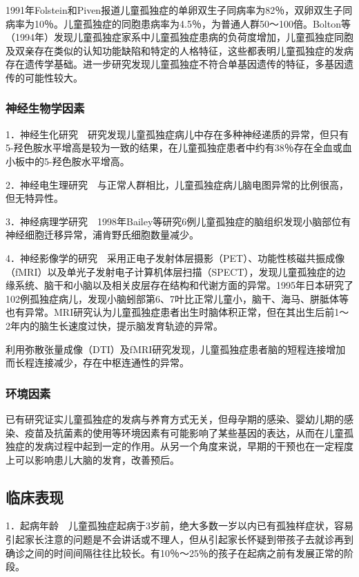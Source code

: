 1991年Folstein和Piven报道儿童孤独症的单卵双生子同病率为82％，双卵双生子同病率为10％。儿童孤独症的同胞患病率为4.5％，为普通人群50～100倍。Bolton等（1994年）发现儿童孤独症家系中儿童孤独症患病的负荷度增加，儿童孤独症同胞及双亲存在类似的认知功能缺陷和特定的人格特征，这些都表明儿童孤独症的发病存在遗传学基础。进一步研究发现儿童孤独症不符合单基因遗传的特征，多基因遗传的可能性较大。

\subsubsection{神经生物学因素}

1．神经生化研究　研究发现儿童孤独症病儿中存在多种神经递质的异常，但只有5-羟色胺水平增高是较为一致的结果，在儿童孤独症患者中约有38％存在全血或血小板中的5-羟色胺水平增高。

2．神经电生理研究　与正常人群相比，儿童孤独症病儿脑电图异常的比例很高，但无特异性。

3．神经病理学研究　1998年Bailey等研究6例儿童孤独症的脑组织发现小脑部位有神经细胞迁移异常，浦肯野氏细胞数量减少。

4．神经影像学的研究　采用正电子发射体层摄影（PET）、功能性核磁共振成像（fMRI）以及单光子发射电子计算机体层扫描（SPECT），发现儿童孤独症的边缘系统、脑干和小脑以及相关皮层存在结构和代谢方面的异常。1995年日本研究了102例孤独症病儿，发现小脑蚓部第6、7叶比正常儿童小，脑干、海马、胼胝体等也有异常。MRI研究认为儿童孤独症患者出生时脑体积正常，但在其出生后前1～2年内的脑生长速度过快，提示脑发育轨迹的异常。

利用弥散张量成像（DTI）及fMRI研究发现，儿童孤独症患者脑的短程连接增加而长程连接减少，存在中枢连通性的异常。

\subsubsection{环境因素}

已有研究证实儿童孤独症的发病与养育方式无关，但母孕期的感染、婴幼儿期的感染、疫苗及抗菌素的使用等环境因素有可能影响了某些基因的表达，从而在儿童孤独症的发病过程中起到一定的作用。从另一个角度来说，早期的干预也在一定程度上可以影响患儿大脑的发育，改善预后。

\subsection{临床表现}

1．起病年龄　儿童孤独症起病于3岁前，绝大多数一岁以内已有孤独样症状，容易引起家长注意的问题是不会讲话或不理人，但从引起家长怀疑到带孩子去就诊再到确诊之间的时间间隔往往比较长。有10％～25％的孩子在起病之前有发展正常的阶段。

